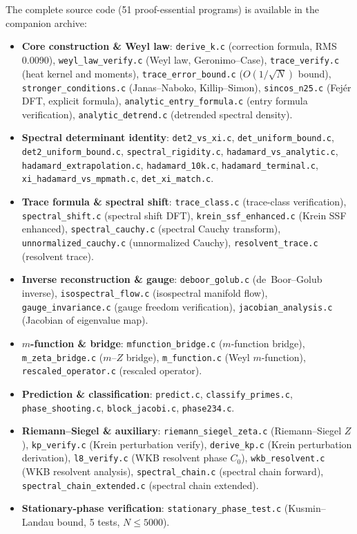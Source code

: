 \documentclass{pre-aomart}
\def\zeta{Z}%
\theoremstyle{plain}
\theoremstyle{definition}
\theoremstyle{remark}
\begin{document}
The complete source code (51 proof-essential programs) is available in the companion archive:
{\raggedright
\begin{itemize}
\item \textbf{Core construction \& Weyl law}:
  \texttt{derive\_k.c} (correction formula, RMS 0.0090),
  \texttt{weyl\_law\_verify.c} (Weyl law, Geronimo--Case),
  \texttt{trace\_verify.c} (heat kernel and moments),
  \texttt{trace\_error\_bound.c} ($O(1/\sqrt{N})$ bound),
  \texttt{stronger\_conditions.c} (Janas--Naboko, Killip--Simon),
  \texttt{sincos\_n25.c} (Fej\'er DFT, explicit formula),
  \texttt{analytic\_entry\_formula.c} (entry formula verification),
  \texttt{analytic\_detrend.c} (detrended spectral density).
\item \textbf{Spectral determinant identity}:
  \texttt{det2\_vs\_xi.c},
  \texttt{det\_uniform\_bound.c},
  \texttt{det2\_uniform\_bound.c},
  \texttt{spectral\_rigidity.c},
  \texttt{hadamard\_vs\_analytic.c},
  \texttt{hadamard\_extrapolation.c},
  \texttt{hadamard\_10k.c},
  \texttt{hadamard\_terminal.c},
  \texttt{xi\_hadamard\_vs\_mpmath.c},
  \texttt{det\_xi\_match.c}.
\item \textbf{Trace formula \& spectral shift}:
  \texttt{trace\_class.c} (trace-class verification),
  \texttt{spectral\_shift.c} (spectral shift DFT),
  \texttt{krein\_ssf\_enhanced.c} (Krein SSF enhanced),
  \texttt{spectral\_cauchy.c} (spectral Cauchy transform),
  \texttt{unnormalized\_cauchy.c} (unnormalized Cauchy),
  \texttt{resolvent\_trace.c} (resolvent trace).
\item \textbf{Inverse reconstruction \& gauge}:
  \texttt{deboor\_golub.c} (de~Boor--Golub inverse),
  \texttt{isospectral\_flow.c} (isospectral manifold flow),
  \texttt{gauge\_invariance.c} (gauge freedom verification),
  \texttt{jacobian\_analysis.c} (Jacobian of eigenvalue map).
\item \textbf{$m$-function \& bridge}:
  \texttt{mfunction\_bridge.c} ($m$-function bridge),
  \texttt{m\_zeta\_bridge.c} ($m$--$\zeta$ bridge),
  \texttt{m\_function.c} (Weyl $m$-function),
  \texttt{rescaled\_operator.c} (rescaled operator).
\item \textbf{Prediction \& classification}:
  \texttt{predict.c}, \texttt{classify\_primes.c},
  \texttt{phase\_shooting.c},
  \texttt{block\_jacobi.c}, \texttt{phase234.c}.
\item \textbf{Riemann--Siegel \& auxiliary}:
  \texttt{riemann\_siegel\_zeta.c} (Riemann--Siegel $\zeta$),
  \texttt{kp\_verify.c} (Krein perturbation verify),
  \texttt{derive\_kp.c} (Krein perturbation derivation),
  \texttt{l8\_verify.c} (WKB resolvent phase $C_0$),
  \texttt{wkb\_resolvent.c} (WKB resolvent analysis),
  \texttt{spectral\_chain.c} (spectral chain forward),
  \texttt{spectral\_chain\_extended.c} (spectral chain extended).
\item \textbf{Stationary-phase verification}:
  \texttt{stationary\_phase\_test.c} (Kusmin--Landau bound, 5 tests, $N \le 5000$).
\end{itemize}
}
\end{document}
